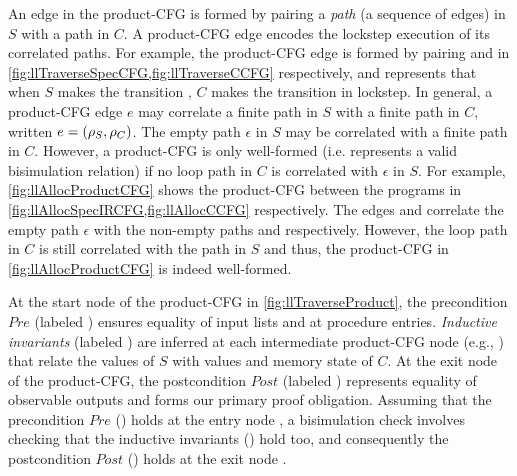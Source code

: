 An edge in the product-CFG is formed by pairing a {\em path} (a sequence of edges) in $S$
with a path in $C$.
A product-CFG edge encodes the lockstep execution of its correlated paths.
For example, the product-CFG edge  is formed by pairing
 and  in \cref{fig:llTraverseSpecCFG,fig:llTraverseCCFG} respectively,
and represents that when $S$ makes the transition , $C$ makes the transition 
in lockstep.
In general, a product-CFG edge $e$ may correlate a finite path \sv{\rho} in $S$ with a finite path
\cv{\rho} in $C$, written $e=({\tt \rho}_{S},{\tt \rho}_{C})$.
The empty path $\epsilon$ in $S$ may be correlated with a finite path in $C$.
However, a product-CFG is only well-formed (i.e. represents a valid bisimulation relation)
if no loop path in $C$ is correlated with $\epsilon$ in $S$.
For example, \cref{fig:llAllocProductCFG} shows the product-CFG between the programs
in \cref{fig:llAllocSpecIRCFG,fig:llAllocCCFG} respectively.
The edges  and  correlate the empty path $\epsilon$
with the non-empty paths  and  respectively.
However, the loop path  in $C$ is still correlated with the path 
in $S$ and thus, the product-CFG in \cref{fig:llAllocProductCFG} is indeed well-formed.

At the start node  of the product-CFG in \cref{fig:llTraverseProduct},
the precondition $Pre$ (labeled )
ensures equality of input lists  and  at procedure entries.
{\em Inductive invariants} (labeled ) are inferred
at each intermediate product-CFG node (e.g., ) that relate
the values of $S$ with values and memory state of $C$.
At the exit node  of the product-CFG, the postcondition $Post$ (labeled )
represents equality of observable outputs and forms our primary proof obligation.
Assuming that the precondition $Pre$ () holds at the entry node ,
a bisimulation check involves checking that the inductive invariants () hold too,
and consequently the postcondition $Post$ () holds at the exit node .

